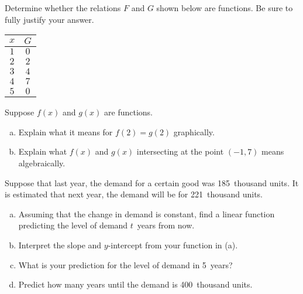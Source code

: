 \documentclass[11pt,letterpaper]{article}
\begin{document}
\prob Determine whether the relations $F$ and $G$ shown below are functions. Be sure to fully justify your answer. \pspace
	\hfill
	\begin{minipage}[c]{0.48\textwidth}
	\end{minipage}%
	\begin{minipage}[c]{0.40\textwidth}
	\begin{table}[H]
	\centering
	\begin{tabular}{cc}
	$x$ & $G$ \\ \hline
	$1$ & $0$ \\
	$2$ & $2$ \\
	$3$ & $4$ \\
	$4$ & $7$ \\
	$5$ & $0$
	\end{tabular}
	\end{table}
	\end{minipage} \pspace 


\prob Suppose $f(x)$ and $g(x)$ are functions. 
	\begin{enumerate}[(a)]
	\item Explain what it means for $f(2)= g(2)$ graphically. 
	\item Explain what $f(x)$ and $g(x)$ intersecting at the point $(-1, 7)$ means algebraically. 
	\end{enumerate} \pspace	
	

\prob Suppose that last year, the demand for a certain good was 185~thousand units. It is estimated that next year, the demand will be for 221~thousand units. 
	\begin{enumerate}[(a)]
	\item Assuming that the change in demand is constant, find a linear function predicting the level of demand $t$~years from now.
	\item Interpret the slope and $y$-intercept from your function in (a).
	\item What is your prediction for the level of demand in 5~years?
	\item Predict how many years until the demand is 400~thousand units. 
	\end{enumerate} \pspace
\end{document}
